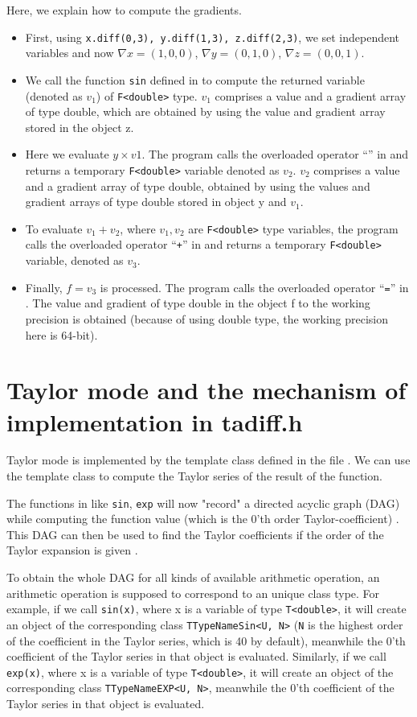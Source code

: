 Here, we explain how to compute the gradients.
\begin{itemize}
	\item First, using \texttt{x.diff(0,3), y.diff(1,3), z.diff(2,3)}, we set independent variables and now $\nabla x=(1,0,0)$, $\nabla y=(0,1,0)$, $\nabla z=(0,0,1)$.
	\item We call the function \texttt{sin} defined in \fadiff to compute the returned variable (denoted as $v_1$) of \texttt{F<double>} type. $v_1$ comprises a value and a gradient array of type double, which are obtained by using the value and gradient array stored in the object z.
	\item Here we evaluate $y \times v1$. The program calls the overloaded operator ``{\tt *}'' in \fadiff and returns a temporary {\tt F<double>} variable denoted as $v_2$. $v_2$ comprises a value and a gradient array of type double, obtained by using the values and gradient arrays of type double stored in object y and $v_1$.
	\item To evaluate $v_1+v_2$, where $v_1, v_2$ are {\tt F<double>} type variables, the program calls the overloaded operator ``{\tt +}'' in \fadiff and returns a temporary {\tt F<double>} variable, denoted as $v_3$.
	\item Finally, $f=v_3$ is processed. The program calls the overloaded operator ``{\tt =}'' in \fadiff. The value and gradient of type double in the object f to the working precision is obtained (because of using double type, the working precision here is 64-bit).
\end{itemize}

\section{Taylor mode and the mechanism of implementation in tadiff.h}\label{sc:fadbadtaylormode}
Taylor mode is implemented by the template class \Tn defined in the file \tadiff. We can use the template class \T to compute the Taylor series of the result of the function.

The functions in \tadiff like {\tt sin}, {\tt exp} will now "record" a directed acyclic graph (DAG) while computing the function value (which is the 0'th order Taylor-coefficient) \cite{FADBAD++}. This DAG can then be used to find the Taylor coefficients if the order of the Taylor expansion is given \cite{IntroAl}.

To obtain the whole DAG for all kinds of available arithmetic operation, an arithmetic operation is supposed to correspond to an unique class type. For example, if we call {\tt sin(x)}, where x is a variable of type {\tt T<double>}, it will create an object of the corresponding class {\tt TTypeNameSin<U, N>} (\texttt{N} is the highest order of the coefficient in the Taylor series, which is 40 by default), meanwhile the 0'th coefficient of the Taylor series in that object is evaluated. Similarly, if we call {\tt exp(x)}, where x is a variable of type {\tt T<double>}, it will create an object of the corresponding class {\tt TTypeNameEXP<U, N>}, meanwhile the 0'th coefficient of the Taylor series in that object is evaluated.

